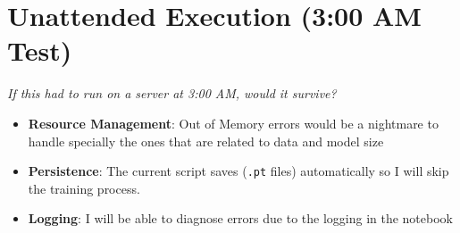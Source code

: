 \documentclass{article}
\begin{document}
\section{Unattended Execution (3:00 AM Test)}
\textit{If this had to run on a server at 3:00 AM, would it survive?}
\begin{itemize}
    \item \textbf{Resource Management}: Out of Memory errors would be a nightmare to handle specially the ones that are related to data and model size
    \item \textbf{Persistence}: The current script saves (\texttt{.pt} files) automatically so I will skip the training process.
    \item \textbf{Logging}: I will be able to diagnose errors due to the logging in the notebook 
\end{itemize}
\end{document}
